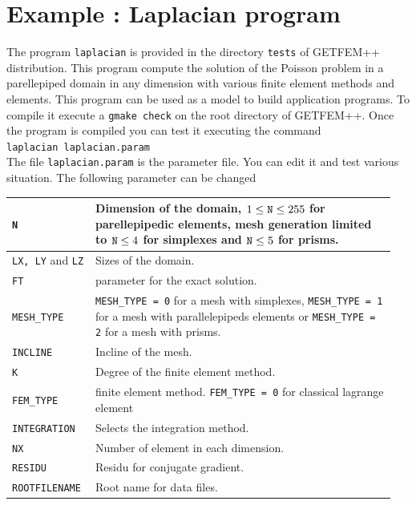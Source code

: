 \documentclass[11pt,a4paper]{article}
\begin{document}
\section{Example : Laplacian program}

The program {\tt laplacian} is provided in the directory {\tt tests} of GETFEM++ distribution. This program compute the solution of the Poisson problem in a parellepiped domain in any dimension with various finite element methods and elements. This program can be used as a model to build application programs. To compile it execute a {\tt gmake check} on the root directory of GETFEM++. Once the program is compiled you can test it executing the command\\[0.5cm]
{\tt laplacian laplacian.param}\\[0.5cm]
The file {\tt laplacian.param} is the parameter file. You can edit it and test various situation. The following parameter can be changed\\[0.5cm]
\begin{center} \begin{tabular}{|m{0.2\linewidth}|m{0.75\linewidth}|} \hline

  {\tt N} & Dimension of the domain, $1 \leq {\tt N} \leq 255$ for parellepipedic elements, mesh generation limited to ${\tt N} \leq 4$ for simplexes and ${\tt N} \leq 5$ for prisms.  \\ \hline

  {\tt LX, LY} and {\tt LZ} &  Sizes of the domain. \\ \hline

  {\tt FT} &  parameter for the exact solution. \\ \hline

  {\tt MESH\_TYPE} &  {\tt MESH\_TYPE = 0} for a mesh with simplexes,   {\tt MESH\_TYPE = 1} for a mesh with parallelepipeds elements or {\tt MESH\_TYPE = 2} for a mesh with prisms. \\ \hline

  {\tt INCLINE} &  Incline of the mesh.\\ \hline

  {\tt K} &  Degree of the finite element method. \\ \hline

  {\tt FEM\_TYPE} &  finite element method.  {\tt FEM\_TYPE = 0} for classical lagrange element\\ \hline

  {\tt INTEGRATION} & Selects the integration method.  \\ \hline

  {\tt NX} &  Number of element in each dimension. \\ \hline

  {\tt RESIDU} & Residu for conjugate gradient. \\ \hline

  {\tt ROOTFILENAME} & Root name for data files. \\ \hline

\end{tabular} \end{center}
\end{document}
